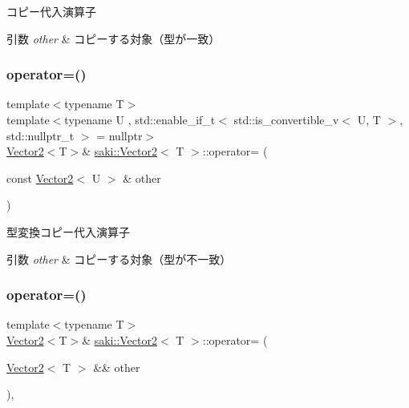 コピー代入演算子 


\begin{DoxyParams}{引数}
{\em other} & コピーする対象（型が一致） \\
\hline
\end{DoxyParams}
\mbox{\label{classsaki_1_1_vector2_aff69a4dc858a6a8b3d598db350d59dd0}} 
\subsubsection{\texorpdfstring{operator=()}{operator=()}\hspace{0.1cm}{\footnotesize\ttfamily [2/4]}}
{\footnotesize\ttfamily template$<$typename T$>$ \\
template$<$typename U , std\+::enable\+\_\+if\+\_\+t$<$ std\+::is\+\_\+convertible\+\_\+v$<$ U, T $>$, std\+::nullptr\+\_\+t $>$  = nullptr$>$ \\
\mbox{\hyperlink{classsaki_1_1_vector2}{Vector2}}$<$T$>$\& \mbox{\hyperlink{classsaki_1_1_vector2}{saki\+::\+Vector2}}$<$ T $>$\+::operator= (\begin{DoxyParamCaption}\item[{const \mbox{\hyperlink{classsaki_1_1_vector2}{Vector2}}$<$ U $>$ \&}]{other }\end{DoxyParamCaption})\hspace{0.3cm}{\ttfamily [inline]}}



型変換コピー代入演算子 


\begin{DoxyParams}{引数}
{\em other} & コピーする対象（型が不一致） \\
\hline
\end{DoxyParams}
\mbox{\label{classsaki_1_1_vector2_a453d91aee14283e657be81258d62a6d9}} 
\subsubsection{\texorpdfstring{operator=()}{operator=()}\hspace{0.1cm}{\footnotesize\ttfamily [3/4]}}
{\footnotesize\ttfamily template$<$typename T$>$ \\
\mbox{\hyperlink{classsaki_1_1_vector2}{Vector2}}$<$T$>$\& \mbox{\hyperlink{classsaki_1_1_vector2}{saki\+::\+Vector2}}$<$ T $>$\+::operator= (\begin{DoxyParamCaption}\item[{\mbox{\hyperlink{classsaki_1_1_vector2}{Vector2}}$<$ T $>$ \&\&}]{other }\end{DoxyParamCaption})\hspace{0.3cm}{\ttfamily [inline]}, {\ttfamily [noexcept]}}



